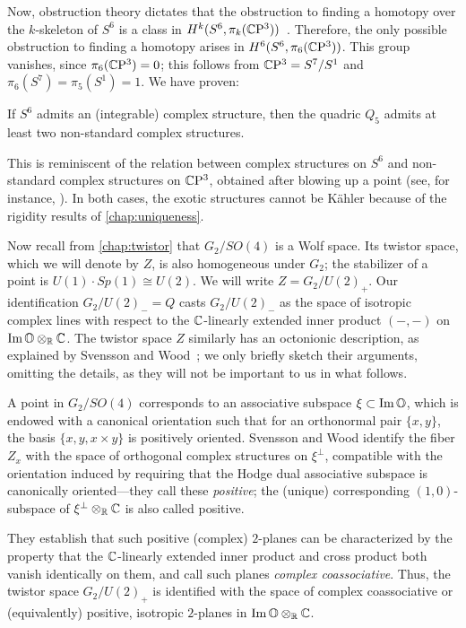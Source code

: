 Now, obstruction theory dictates that the obstruction to finding a homotopy over the $k$-skeleton of $S^6$ is a class in $H^k(S^6,\pi_k(\mathbb{C}\mathrm{P}^3))$~\cite[Ch.~7]{DK2001}. Therefore, the only possible obstruction to finding a homotopy arises in $H^6(S^6,\pi_6(\mathbb{C}\mathrm{P}^3))$. This group vanishes, since $\pi_6(\mathbb{C}\mathrm{P}^3)=0$; this follows from $\mathbb{C}\mathrm{P}^3=S^7/S^1$ and $\pi_6(S^7)=\pi_5(S^1)=1$. We have proven:

\begin{prop}
	If $S^6$ admits an (integrable) complex structure, then the quadric $Q_5$ admits at least two non-standard complex structures.\proofclear
\end{prop}

This is reminiscent of the relation between complex structures on $S^6$ and non-standard complex structures on $\mathbb{C}\mathrm{P}^3$, obtained after blowing up a point (see, for instance, \cite{HKP2000}). In both cases, the exotic structures cannot be K\"ahler because of the rigidity results of \cref{chap:uniqueness}.

Now recall from \cref{chap:twistor} that $G_2/SO(4)$ is a Wolf space. Its twistor space, which we will denote by $Z$, is also homogeneous under $G_2$; the stabilizer of a point is $U(1)\cdot Sp(1)\cong U(2)$. We will write $Z=G_2/U(2)_+$. Our identification $G_2/U(2)_-=Q$ casts $G_2/U(2)_-$ as the space of isotropic complex lines with respect to the $\mathbb{C}$-linearly extended inner product $(-,-)$ on $\operatorname{Im}\mathbb{O}\otimes_{\mathbb{R}}\mathbb{C}$. The twistor space $Z$ similarly has an octonionic description, as explained by Svensson and Wood~\cite{SW2015}; we only briefly sketch their arguments, omitting the details, as they will not be important to us in what follows.

A point in $G_2/SO(4)$ corresponds to an associative subspace $\xi\subset \operatorname{Im}\mathbb{O}$, which is endowed with a canonical orientation such that for an orthonormal pair $\{x,y\}$, the basis $\{x,y,x\times y\}$ is positively oriented. Svensson and Wood identify the fiber $Z_x$ with the space of orthogonal complex structures on $\xi^\perp$, compatible with the orientation induced by requiring that the Hodge dual associative subspace is canonically oriented---they call these \emph{positive};
the (unique) corresponding $(1,0)$-subspace of $\xi^\perp\otimes_{\mathbb{R}}\mathbb{C}$ is also called positive. 

They establish that such positive (complex) $2$-planes can be characterized by the property that the $\mathbb{C}$-linearly extended inner product and cross product both vanish identically on them, and call such planes \emph{complex coassociative}. Thus, the twistor space $G_2/U(2)_+$ is identified with the space of complex coassociative or (equivalently) positive, isotropic $2$-planes in $\operatorname{Im}\mathbb{O}\otimes_{\mathbb{R}}\mathbb{C}$.

